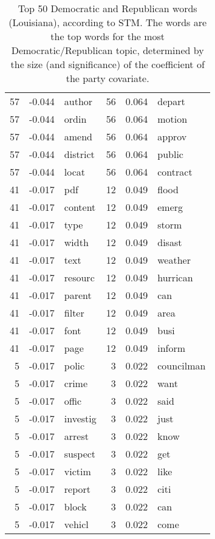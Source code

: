 \begin{table}[ht]
\begin{tabular}{rrlrrl}
    57 & -0.044 & author &   56 & 0.064 & depart \\ 
    57 & -0.044 & ordin &   56 & 0.064 & motion \\ 
    57 & -0.044 & amend &   56 & 0.064 & approv \\ 
    57 & -0.044 & district &   56 & 0.064 & public \\ 
    57 & -0.044 & locat &   56 & 0.064 & contract \\ 
    41 & -0.017 & pdf &   12 & 0.049 & flood \\ 
    41 & -0.017 & content &   12 & 0.049 & emerg \\ 
    41 & -0.017 & type &   12 & 0.049 & storm \\ 
    41 & -0.017 & width &   12 & 0.049 & disast \\ 
    41 & -0.017 & text &   12 & 0.049 & weather \\ 
    41 & -0.017 & resourc &   12 & 0.049 & hurrican \\ 
    41 & -0.017 & parent &   12 & 0.049 & can \\ 
    41 & -0.017 & filter &   12 & 0.049 & area \\ 
    41 & -0.017 & font &   12 & 0.049 & busi \\ 
    41 & -0.017 & page &   12 & 0.049 & inform \\ 
     5 & -0.017 & polic &    3 & 0.022 & councilman \\ 
     5 & -0.017 & crime &    3 & 0.022 & want \\ 
     5 & -0.017 & offic &    3 & 0.022 & said \\ 
     5 & -0.017 & investig &    3 & 0.022 & just \\ 
     5 & -0.017 & arrest &    3 & 0.022 & know \\ 
     5 & -0.017 & suspect &    3 & 0.022 & get \\ 
     5 & -0.017 & victim &    3 & 0.022 & like \\ 
     5 & -0.017 & report &    3 & 0.022 & citi \\ 
     5 & -0.017 & block &    3 & 0.022 & can \\ 
     5 & -0.017 & vehicl &    3 & 0.022 & come \\ 
   \hline
\end{tabular}
\endgroup
\caption{Top 50 Democratic and Republican words (Louisiana), according to STM. 
             The words are the top words for the most Democratic/Republican topic, determined
             by the size (and significance) of the coefficient of the party covariate.} 
\label{tabSTMLA}
\end{table}

